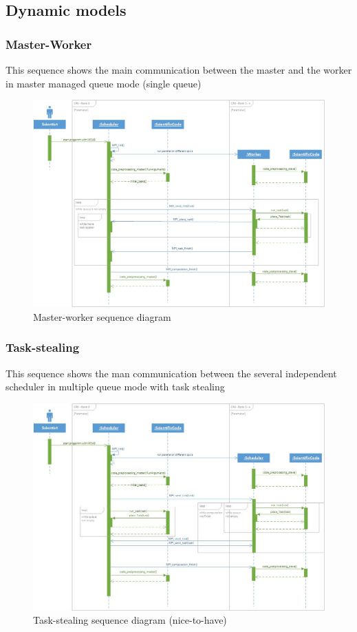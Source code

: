 \subsection{Dynamic models}
	\subsubsection{Master-Worker}
	This sequence shows the main communication between the master and the worker in master managed queue mode (single queue) 
	\begin{figure}[H]
		\includegraphics[width=15cm]{images/Master-slave.jpg}
		\caption{Master-worker sequence diagram} 
		
	\end{figure}
	
	\subsubsection{Task-stealing}
	This sequence shows the man communication between the several independent scheduler in multiple queue mode with task stealing
	\begin{figure}[H]
		\includegraphics[width=15cm]{images/Task-stealing.jpg}
		\caption{Task-stealing sequence diagram (nice-to-have)}
	\end{figure}


